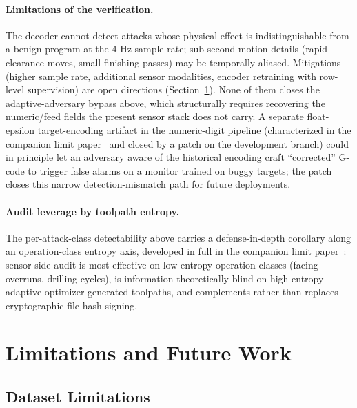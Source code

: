 \documentclass[sensors,article,submit,moreauthors,pdftex]{Definitions/mdpi}
\begin{document}
\paragraph{Limitations of the verification.} The decoder cannot detect attacks whose physical effect is indistinguishable from a benign program at the 4-Hz sample rate; sub-second motion details (rapid clearance moves, small finishing passes) may be temporally aliased. Mitigations (higher sample rate, additional sensor modalities, encoder retraining with row-level supervision) are open directions (Section~\ref{sec:future}). None of them closes the adaptive-adversary bypass above, which structurally requires recovering the numeric/feed fields the present sensor stack does not carry. A separate float-epsilon target-encoding artifact in the numeric-digit pipeline (characterized in the companion limit paper~\cite{paperB_entropy} and closed by a patch on the development branch) could in principle let an adversary aware of the historical encoding craft ``corrected'' G-code to trigger false alarms on a monitor trained on buggy targets; the patch closes this narrow detection-mismatch path for future deployments.

\paragraph{Audit leverage by toolpath entropy.} The per-attack-class detectability above carries a defense-in-depth corollary along an operation-class entropy axis, developed in full in the companion limit paper~\cite{paperB_entropy}: sensor-side audit is most effective on low-entropy operation classes (facing overruns, drilling cycles), is information-theoretically blind on high-entropy adaptive optimizer-generated toolpaths, and complements rather than replaces cryptographic file-hash signing.

\section{Limitations and Future Work}
\label{sec:future}

\subsection{Dataset Limitations}
\label{sec:lim-dataset}
\end{document}
